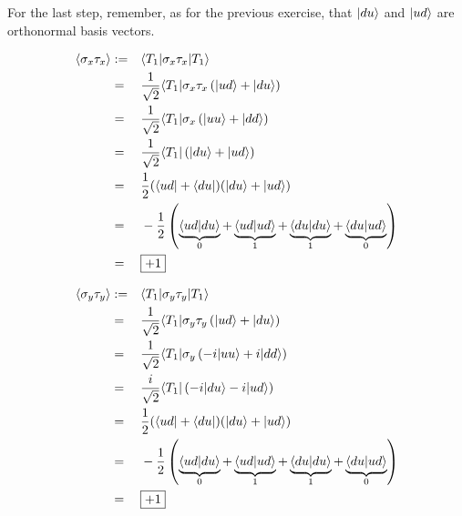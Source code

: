 \documentclass[solutions.tex]{subfiles}
\begin{document}
For the last step, remember, as for the previous exercise, that $|du\rangle$
and $|ud\rangle$ are orthonormal basis vectors.

\hrr

\begin{equation*}\begin{aligned}
	\left\langle \sigma_x\tau_x \right\rangle &:=&& \langle T_1|\sigma_x\tau_x|T_1\rangle \\
	~ &=&& \frac1{\sqrt2}\langle T_1|\sigma_x\tau_x\left(|ud\rangle+|du\rangle\right) \\
	~ &=&& \frac1{\sqrt2}\langle T_1|\sigma_x\left(|uu\rangle+|dd\rangle\right) \\
	~ &=&& \frac1{\sqrt2}\langle T_1|\left(|du\rangle+|ud\rangle\right) \\
	~ &=&& \frac12(\langle ud|+\langle du|)(|du\rangle+|ud\rangle) \\
	~ &=&& -\frac12\left(
		\underbrace{\left\langle ud \middle| du \right\rangle}_{0}
		+\underbrace{\left\langle ud \middle| ud \right\rangle}_{1}
		+\underbrace{\left\langle du \middle| du \right\rangle}_{1}
		+\underbrace{\left\langle du \middle| ud \right\rangle}_{0}
	\right) \\
	~ &=&&\boxed{+1}
\end{aligned}\end{equation*}

\hrr

\begin{equation*}\begin{aligned}
	\left\langle \sigma_y\tau_y \right\rangle &:=&& \langle T_1|\sigma_y\tau_y|T_1\rangle \\
	~ &=&& \frac1{\sqrt2}\langle T_1|\sigma_y\tau_y\left(|ud\rangle+|du\rangle\right) \\
	~ &=&& \frac1{\sqrt2}\langle T_1|\sigma_y\left(-i|uu\rangle+i|dd\rangle\right) \\
	~ &=&& \frac{i}{\sqrt2}\langle T_1|\left(-i|du\rangle-i|ud\rangle\right) \\
	~ &=&& \frac12(\langle ud|+\langle du|)(|du\rangle+|ud\rangle) \\
	~ &=&& -\frac12\left(
		\underbrace{\left\langle ud \middle| du \right\rangle}_{0}
		+\underbrace{\left\langle ud \middle| ud \right\rangle}_{1}
		+\underbrace{\left\langle du \middle| du \right\rangle}_{1}
		+\underbrace{\left\langle du \middle| ud \right\rangle}_{0}
	\right) \\
	~ &=&&\boxed{+1}
\end{aligned}\end{equation*}
\end{document}
